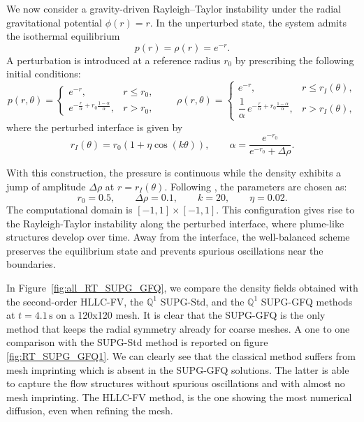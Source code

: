 \documentclass[a4paper,10pt]{article}
\begin{document}
		We now consider a gravity-driven Rayleigh--Taylor instability under the radial gravitational potential $\phi(r)=r$. In the unperturbed state, the system admits the isothermal equilibrium
		\begin{equation}
			p(r) = \rho(r) = e^{-r}.
		\end{equation}
		A perturbation is introduced at a reference radius $r_0$ by prescribing the following initial conditions:
		\begin{equation}
			p(r,\theta) = 
			\begin{cases}
				e^{-r}, & r \leq r_0, \\[0.3em]
				e^{-\tfrac{r}{\alpha} + r_0 \tfrac{1-\alpha}{\alpha}}, & r > r_0,
			\end{cases}
			\qquad
			\rho(r,\theta) =
			\begin{cases}
				e^{-r}, & r \leq r_I(\theta), \\[0.3em]
				\dfrac{1}{\alpha}\, e^{-\tfrac{r}{\alpha} + r_0 \tfrac{1-\alpha}{\alpha}}, & r > r_I(\theta),
			\end{cases}
		\end{equation}
		where the perturbed interface is given by
		\begin{equation}
			r_I(\theta) = r_0 \left(1 + \eta \cos(k\theta)\right),
			\qquad
			\alpha = \frac{e^{-r_0}}{e^{-r_0} + \Delta \rho}.
		\end{equation}
		
		With this construction, the pressure is continuous while the density exhibits a jump of amplitude 
		$\Delta \rho$ at $r = r_I(\theta)$. Following \cite{leveque1999wave}, the parameters are chosen as:
		\begin{equation}
			r_0 = 0.5, 
			\qquad \Delta \rho = 0.1, 
			\qquad k = 20, 
			\qquad \eta = 0.02.
		\end{equation}
		The computational domain is $[-1,1]\times[-1,1]$.  This configuration gives rise to the Rayleigh-Taylor instability along the perturbed interface, where plume-like 
		structures develop over time. Away from the interface, the well-balanced scheme preserves the equilibrium state and prevents spurious oscillations near the boundaries.
		
		In Figure~\ref{fig:all_RT_SUPG_GFQ}, we compare the density fields obtained with the second-order HLLC-FV, the $\mathbb{Q}^1$ SUPG-Std, and the $\mathbb{Q}^1$ SUPG-GFQ methods at $t=4.1\,\mathrm{s}$ on a 120x120 mesh. It is clear that the SUPG-GFQ is the only method that keeps the radial symmetry already for  coarse meshes. 
		A one to one comparison with the  SUPG-Std method is reported on figure \ref{fig:RT_SUPG_GFQ1}. We can clearly see that the 
		classical method  suffers from mesh imprinting which is   absent in the 
		SUPG-GFQ  solutions. The latter is able to capture the flow structures without spurious oscillations and with almost no mesh imprinting. 
		The HLLC-FV method,  is the one showing the most numerical diffusion, even when refining the mesh. 
		
\end{document}
